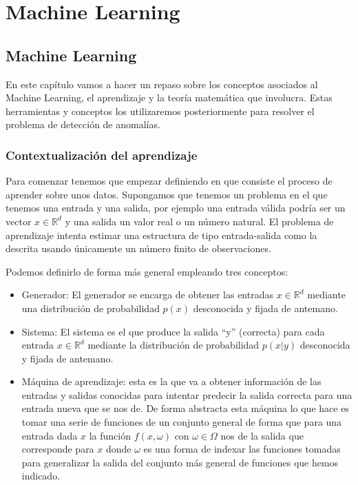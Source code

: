 \part{Machine Learning}
\label{part:machineLearning}

\chapter{Machine Learning}
\label{chapter:machine_learning}

En este capítulo vamos a hacer un repaso sobre los conceptos asociados al Machine Learning, el aprendizaje y la teoría matemática que involucra. Estas herramientas y conceptos los utilizaremos posteriormente para resolver el problema de detección de anomalías.

\section{Contextualización del aprendizaje}

Para comenzar tenemos que empezar definiendo en que consiste el proceso de aprender sobre unos datos. Supongamos que tenemos un problema en el que tenemos una entrada y una salida, por ejemplo una entrada válida podría ser un vector $x\in \mathbb{R}^d$ y una salida un valor real o un número natural. El problema de aprendizaje intenta estimar una estructura de tipo entrada-salida como la descrita usando únicamente un número finito de observaciones.

Podemos definirlo de forma más general empleando tres conceptos:

\begin{itemize}
	\item Generador: El generador se encarga de obtener las entradas $x\in \mathbb{R}^d$ mediante una distribución de probabilidad $p(x)$ desconocida y fijada de antemano.
	\item Sistema: El sistema es el que produce la salida ``y'' (correcta) para cada entrada $x\in \mathbb{R}^d$ mediante la distribución de probabilidad $p(x|y)$ desconocida y fijada de antemano.
	\item Máquina de aprendizaje: esta es la que va a obtener información de las entradas y salidas conocidas para intentar predecir la salida correcta para una entrada nueva que se nos de. De forma abstracta esta máquina lo que hace es tomar una serie de funciones de un conjunto general de forma que para una entrada dada $x$ la función $f(x,\omega)$ con $\omega \in \Omega$ nos de la salida que corresponde para $x$ donde $\omega$ es una forma de indexar las funciones tomadas para generalizar la salida del conjunto más general de funciones que hemos indicado.
\end{itemize}

